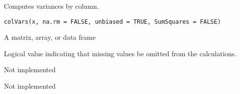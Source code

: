 \begin{Description}\relax
Computes variances by column.
\end{Description}
\begin{Usage}
\begin{verbatim}
colVars(x, na.rm = FALSE, unbiased = TRUE, SumSquares = FALSE)
\end{verbatim}
\end{Usage}
\begin{Arguments}
\begin{ldescription}
\item[\code{x}] A matrix, array, or data frame
\item[\code{na.rm}] Logical value indicating that missing values be omitted from the
calculations.
\item[\code{unbiased}] Not implemented
\item[\code{SumSquares}] Not implemented
\end{ldescription}
\end{Arguments}

